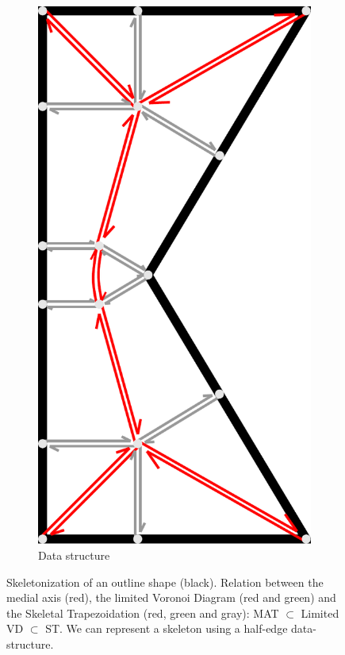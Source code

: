 \begin{figure}
\begin{subfigure}[t]{\figwidth}
\includegraphics[height=\figwidthTwo]{sources/method/half_edge_datastructure.pdf}
\caption{Data structure}\label{shape_decomposition_datastructure}
\end{subfigure}
\caption{
Skeletonization of an outline shape (black).
Relation between the medial axis (red), the limited Voronoi Diagram (red and green) and the Skeletal Trapezoidation (red, green and gray): MAT $\subset$ Limited VD $\subset$ ST.
 We can represent a skeleton using a half-edge data-structure.
}
\label{skeletonization_comparison}
\end{figure}



